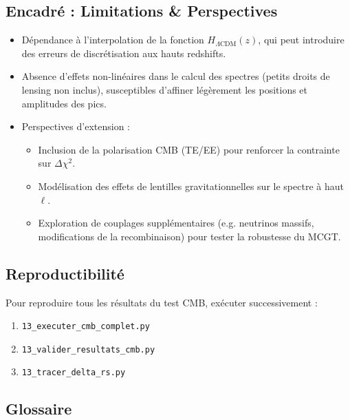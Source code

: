 \subsection*{Encadré : Limitations \& Perspectives}

\begin{itemize}
  \item Dépendance à l’interpolation de la fonction \(H_{\Lambda\mathrm{CDM}}(z)\),
        qui peut introduire des erreurs de discrétisation aux hauts redshifts.
  \item Absence d’effets non-linéaires dans le calcul des spectres (petits droits de lensing non inclus),
        susceptibles d’affiner légèrement les positions et amplitudes des pics.
  \item Perspectives d’extension :
    \begin{itemize}
      \item Inclusion de la polarisation CMB (TE/EE) pour renforcer la contrainte sur \(\Delta\chi^2\).
      \item Modélisation des effets de lentilles gravitationnelles sur le spectre à haut \(\ell\).
      \item Exploration de couplages supplémentaires (e.g. neutrinos massifs, modifications de la recombinaison) pour tester la robustesse du MCGT.
    \end{itemize}
\end{itemize}

\subsection{Reproductibilité}

Pour reproduire tous les résultats du test CMB, exécuter successivement :
\begin{enumerate}
  \item \texttt{13\_executer\_cmb\_complet.py}
  \item \texttt{13\_valider\_resultats\_cmb.py}
  \item \texttt{13\_tracer\_delta\_rs.py}
\end{enumerate}

\subsection*{Glossaire}

